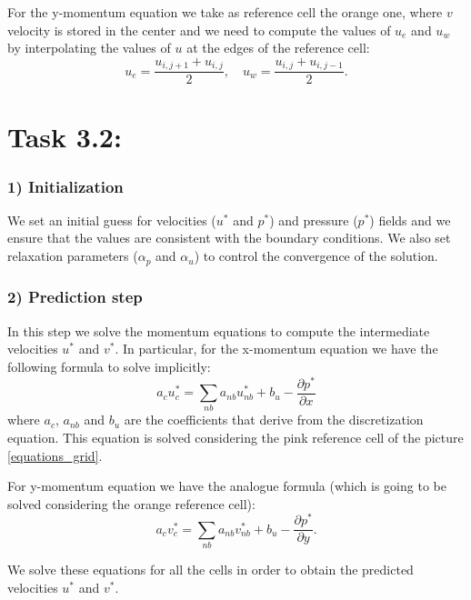 \documentclass{article}
\begin{document}
For the y-momentum equation we take as reference cell the orange one, where $v$ velocity is stored in the center and we need to compute the values of $u_e$ and $u_w$ by interpolating the values of $u$ at the edges of the reference cell:
\begin{equation*}
  u_e = \frac{u_{i,j+1} + u_{i,j}}{2}, \quad u_w = \frac{u_{i,j} + u_{i,j-1}}{2}.
\end{equation*}
  

\newpage
\section*{\Large Task 3.2:}
\subsubsection*{1) Initialization}
We set an initial guess for velocities ($u^*$ and $p^*$) and pressure ($p^*$) fields and we ensure that the values are consistent with the boundary conditions.
We also set relaxation parameters ($\alpha_p$ and $\alpha_u$) to control the convergence of the solution.

\subsubsection*{2) Prediction step}
In this step we solve the momentum equations to compute the intermediate velocities $u^*$ and $v^*$.
In particular, for the x-momentum equation we have the following formula to solve implicitly:
\begin{equation}
  a_{c}u_{c}^*=\sum_{nb}a_{nb}u_{nb}^*+b_{u}-\frac{\partial p^{*}}{\partial x}
\end{equation}
where $a_{c}$, $a_{nb}$ and $b_{u}$ are the coefficients that derive from the discretization equation.
This equation is solved considering the pink reference cell of the picture \ref{equations_grid}.

For y-momentum equation we have the analogue formula (which is going to be solved considering the orange reference cell):
\begin{equation}
  a_{c}v_{c}^*=\sum_{nb}a_{nb}v_{nb}^*+b_{u}-\frac{\partial p^{*}}{\partial y}.
\end{equation}

We solve these equations for all the cells in order to obtain the predicted velocities $u^*$ and $v^*$.
\end{document}
